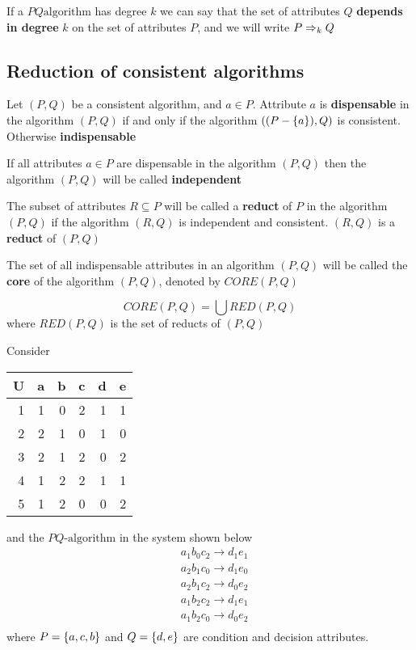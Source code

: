 \documentclass[11pt]{article}
\begin{document}
If a \(PQ\text{algorithm}\) has degree \(k\) we can say that the set of
attributes \(Q\) \textbf{depends in degree} \(k\) on the set of attributes \(P\), and we
will write \(P\Rightarrow_k Q\)
\subsection{Reduction of consistent algorithms}
\label{sec:orgfdae597}
Let \((P,Q)\) be a consistent algorithm, and \(a\in P\). Attribute \(a\) is
\textbf{dispensable} in the algorithm \((P,Q)\) if and only if the algorithm 
\(((P-\left\{ a\right\}),Q)\) is consistent. Otherwise \textbf{indispensable}

If all attributes \(a\in P\) are dispensable in the algorithm \((P,Q)\) then the
algorithm \((P,Q)\) will be called \textbf{independent}

The subset of attributes \(R\subseteq P\) will be called a \textbf{reduct} of \(P\) in the
algorithm \((P,Q)\) if the algorithm \((R,Q)\) is independent and consistent.
\((R,Q)\) is a \textbf{reduct} of \((P,Q)\)

The set of all indispensable attributes in an algorithm \((P,Q)\) will be
called the \textbf{core} of the algorithm \((P,Q)\), denoted by \(CORE(P,Q)\)

\begin{proposition}[7.7]
\begin{equation*}
CORE(P,Q)=\bigcup RED(P,Q)
\end{equation*}
where \(RED(P,Q)\) is the set of reducts of \((P,Q)\)
\end{proposition}

Consider
\begin{center}
\begin{tabular}{rrrrrr}
U & a & b & c & d & e\\
\hline
1 & 1 & 0 & 2 & 1 & 1\\
2 & 2 & 1 & 0 & 1 & 0\\
3 & 2 & 1 & 2 & 0 & 2\\
4 & 1 & 2 & 2 & 1 & 1\\
5 & 1 & 2 & 0 & 0 & 2\\
\end{tabular}
\end{center}
and the \(PQ\text{-algorithm}\) in the system shown below
\begin{align*}
  &a_1b_0c_2\to d_1e_1\\
  &a_2b_1c_0\to d_1e_0\\
  &a_2b_1c_2\to d_0e_2\\
  &a_1b_2c_2\to d_1e_1\\
  &a_1b_2c_0\to d_0e_2\\
\end{align*}
where \(P=\left\{ a,c,b\right\}\) and \(Q=\left\{ d,e\right\}\) are condition and decision
attributes.
\end{document}
